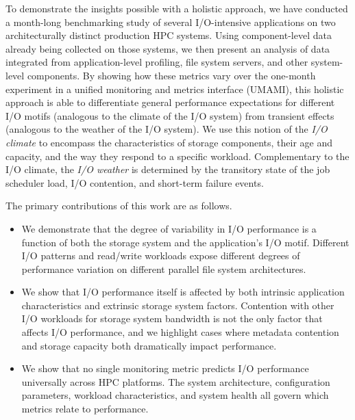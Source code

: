 To demonstrate the insights possible with a holistic approach, we have conducted a month-long benchmarking study of several I/O-intensive applications on two architecturally distinct production HPC systems.
Using component-level data already being collected on those systems, we then present an analysis of data integrated from application-level profiling, file system servers, and other system-level components.
By showing how these metrics vary over the one-month experiment in a unified monitoring and metrics interface (UMAMI), this holistic approach is able to differentiate general performance expectations for different I/O motifs (analogous to the climate of the I/O system) from transient effects (analogous to the weather of the I/O system).
We use this notion of the \emph{I/O climate} to encompass the characteristics of storage components, their age and capacity, and the way they respond to a specific workload.
Complementary to the I/O climate, the \emph{I/O weather} is determined by the transitory state of the job scheduler load, I/O contention, and short-term failure events.

The primary contributions of this work are as follows.
\begin{itemize}[leftmargin=*]
\item We demonstrate that the degree of variability in I/O performance is a function of both the storage system and the application's I/O motif.
Different I/O patterns and read/write workloads expose different degrees of performance variation on different parallel file system architectures.
\item We show that I/O performance itself is affected by both intrinsic application characteristics and extrinsic storage system factors.
Contention with other I/O workloads for storage system bandwidth is not the only factor that affects I/O performance, and
we highlight cases where metadata contention and storage capacity both dramatically impact performance.
\item We show that no single monitoring metric predicts I/O performance universally across HPC platforms.
The system architecture, configuration parameters, workload characteristics, and system health all govern which metrics relate to performance.
\end{itemize}
